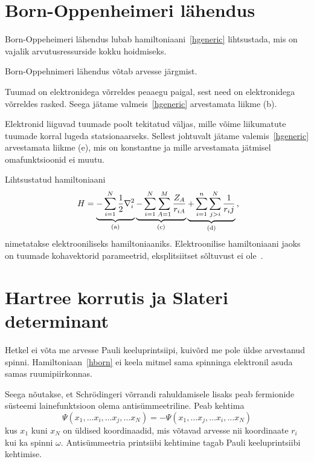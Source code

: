 \documentclass[12pt]{report}
\begin{document}
\section{Born-Oppenheimeri lähendus}\label{born-oppeheimer}

Born-Oppeheimeri lähendus lubab hamiltoniaani~\eqref{hgeneric} lihtsustada, mis on vajalik arvutusressurside kokku hoidmiseks.

Born-Oppehnimeri lähendus võtab arvesse järgmist.

Tuumad on elektronidega võrreldes peaaegu paigal, sest need on elektronidega võrreldes rasked.
Seega jätame valmeis~\eqref{hgeneric} arvestamata liikme (b).

Elektronid liiguvad tuumade poolt tekitatud väljas, mille võime liikumatute tuumade korral lugeda statsionaarseks.
Sellest johtuvalt jätame valemis~\eqref{hgeneric} arvestamata liikme (e), mis on konstantne ja mille arvestamata jätmisel omafunktsioonid ei muutu.

Lihtsustatud hamiltoniaani
\begin{equation}\label{hborn}
    H = \underbrace{-\sum_{i=1}^N\frac{1}{2}\nabla_i^2}_\mathrm{(a)}
        \underbrace{-\sum_{i=1}^N\sum_{A=1}^M\frac{Z_A}{r_{iA}}}_\mathrm{(c)}
        \underbrace{+\sum_{i=1}^n\sum_{j>i}^N\frac{1}{r_ij}}_\mathrm{(d)}\rlap{,}
\end{equation}
nimetatakse elektrooniliseks hamiltoniaaniks.
Elektroonilise hamiltoniaani jaoks on tuumade kohavektorid parameetrid, eksplitsiitset sõltuvust ei ole~\cite{szabo+ostlnud}.

\section{Hartree korrutis ja Slateri determinant}\label{hartree+slater}

Hetkel ei võta me arvesse Pauli keeluprintsiipi, kuivõrd me pole üldse arvestanud spinni.
Hamiltoniaan~\eqref{hborn} ei keela mitmel sama spinninga elektronil asuda samas ruumipiirkonnas.

Seega nõutakse, et Schrödingeri võrrandi rahuldamisele lisaks peab fermionide süsteemi lainefunktsioon olema antisümmeetriline.
Peab kehtima
\begin{equation}
    \Psi(x_1,\ldots x_i,\ldots x_j,\ldots x_N)=-\Psi(x_1,\ldots x_j,\ldots x_i,\ldots x_N)
\end{equation}
kus \(x_1\) kuni \(x_N\) on üldised koordinaadid, mis võtavad arvesse nii koordinaate \(r_i\) kui ka spinni \(\omega\).
Antisümmeetria printsiibi kehtimine tagab Pauli keeluprintsiibi kehtimise.
\end{document}
